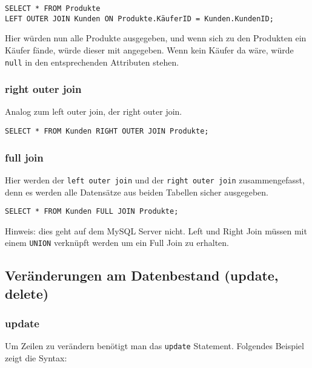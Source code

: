 
\begin{lstlisting}[caption={Left Join SQL}]
SELECT * FROM Produkte 
LEFT OUTER JOIN Kunden ON Produkte.KäuferID = Kunden.KundenID;
\end{lstlisting}

Hier würden nun alle Produkte ausgegeben, und wenn sich zu den Produkten ein Käufer fände, würde dieser mit angegeben. Wenn kein Käufer da wäre, würde \texttt{null} in den entsprechenden Attributen stehen.

\subsubsection{right outer join}
Analog zum left outer join, der right outer join.


\begin{lstlisting}[caption={Right Join SQL}]
SELECT * FROM Kunden RIGHT OUTER JOIN Produkte;
\end{lstlisting}

\subsubsection{full join}
Hier werden der \texttt{left outer join} und der \texttt{right outer join} zusammengefasst, denn es werden alle Datensätze aus beiden Tabellen sicher ausgegeben.


\begin{lstlisting}[caption={Full Join SQL}]
SELECT * FROM Kunden FULL JOIN Produkte;
\end{lstlisting}

Hinweis: dies geht auf dem MySQL Server nicht. Left und Right Join müssen mit einem \texttt{UNION} verknüpft werden um ein Full Join zu erhalten.

\subsection{Veränderungen am Datenbestand (update, delete)}

\subsubsection{update}
Um Zeilen zu verändern benötigt man das \texttt{update} Statement. Folgendes Beispiel zeigt die Syntax:

